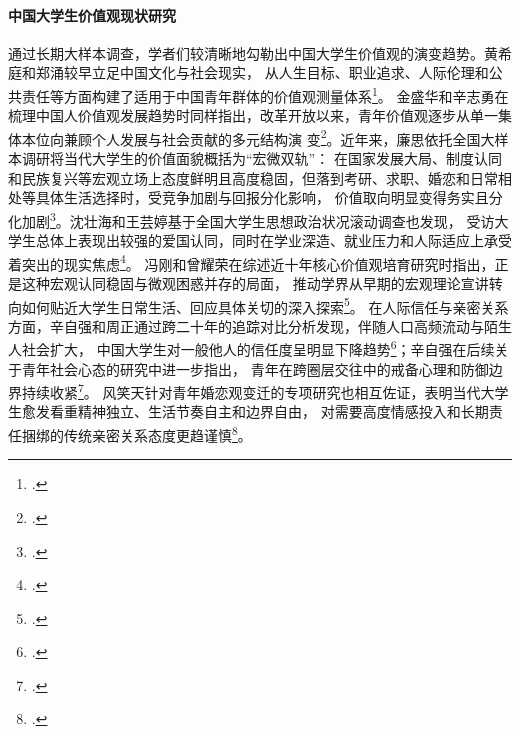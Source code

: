 \paragraph{中国大学生价值观现状研究}
通过长期大样本调查，学者们较清晰地勾勒出中国大学生价值观的演变趋势。黄希庭和郑涌较早立足中国文化与社会现实，
从人生目标、职业追求、人际伦理和公共责任等方面构建了适用于中国青年群体的价值观测量体系\footcite{Huang2005}。
金盛华和辛志勇在梳理中国人价值观发展趋势时同样指出，改革开放以来，青年价值观逐步从单一集体本位向兼顾个人发展与社会贡献的多元结构演
变\footcite{BJSF200303008}。近年来，廉思依托全国大样本调研将当代大学生的价值面貌概括为“宏微双轨”：
在国家发展大局、制度认同和民族复兴等宏观立场上态度鲜明且高度稳固，但落到考研、求职、婚恋和日常相处等具体生活选择时，受竞争加剧与回报分化影响，
价值取向明显变得务实且分化加剧\footcite{Lian2024b}。沈壮海和王芸婷基于全国大学生思想政治状况滚动调查也发现，
受访大学生总体上表现出较强的爱国认同，同时在学业深造、就业压力和人际适应上承受着突出的现实焦虑\footcite{Shen2022}。
冯刚和曾耀荣在综述近十年核心价值观培育研究时指出，正是这种宏观认同稳固与微观困惑并存的局面，
推动学界从早期的宏观理论宣讲转向如何贴近大学生日常生活、回应具体关切的深入探索\footcite{Feng2022}。
在人际信任与亲密关系方面，辛自强和周正通过跨二十年的追踪对比分析发现，伴随人口高频流动与陌生人社会扩大，
中国大学生对一般他人的信任度呈明显下降趋势\footcite{XLXD201203004}；辛自强在后续关于青年社会心态的研究中进一步指出，
青年在跨圈层交往中的戒备心理和防御边界持续收紧\footcite{Xin2020}。
风笑天针对青年婚恋观变迁的专项研究也相互佐证，表明当代大学生愈发看重精神独立、生活节奏自主和边界自由，
对需要高度情感投入和长期责任捆绑的传统亲密关系态度更趋谨慎\footcite{FengXiaotian2018}。

